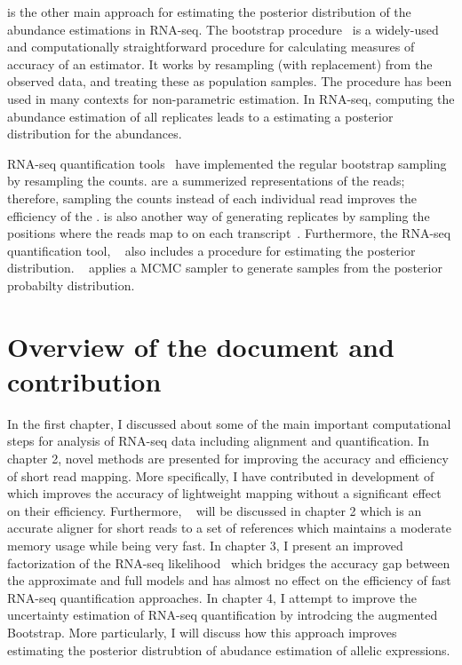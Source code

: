 \boots is the other main approach for estimating the posterior distribution of the abundance
estimations in RNA-seq. The bootstrap procedure~\citep{efron1979computers} is a widely-used 
and computationally straightforward procedure for calculating measures of accuracy of an 
estimator. It works by resampling (with replacement) from the observed data, and treating 
these as population samples. The procedure has been used in many contexts for non-parametric 
estimation. In RNA-seq, computing the abundance estimation of all \boot replicates leads to a 
estimating a posterior distribution for the abundances. 

RNA-seq quantification tools~\citep{kallisto,salmon} have implemented the regular bootstrap 
sampling by resampling the \eqc counts. \Eqcs are a summerized representations of the reads; 
therefore, sampling the \eqc counts instead of each individual read improves the efficiency 
of the \boots. \Pboots is also another way of generating \boot replicates by sampling the 
positions where the reads map to on each transcript~\citep{xiong2016probabilistic}.
Furthermore, the RNA-seq quantification tool, \salmon~\citep{salmon} also includes a \gibbs
procedure for estimating the posterior distribution. \bitseq~\citep{glaus2012identifying} 
applies a MCMC \gib sampler to generate samples from the posterior probabilty distribution. 

\section{Overview of the document and contribution}
In the first chapter, I discussed about some of the main important computational steps
for analysis of RNA-seq data including alignment and quantification.
In chapter 2, novel methods are presented for improving the accuracy and efficiency of 
short read mapping. More specifically, I have contributed in development 
of \sla~\citep{selaln} which improves
the accuracy of lightweight mapping without a significant effect on their efficiency.
Furthermore,  \puffaligner~\citep{almodaresi2021puffaligner} 
will be discussed in chapter 2 which is an accurate aligner for short reads
to a set of references which maintains a moderate memory usage while being very fast.
In chapter 3, I present an improved factorization of the RNA-seq likelihood~\citep{ddfact} 
which bridges the accuracy gap between the approximate and full models and has almost 
no effect on the efficiency of fast RNA-seq quantification approaches.
In chapter 4, I attempt to improve the uncertainty estimation of RNA-seq quantification by 
introdcing the augmented Bootstrap. More particularly, I will discuss how this approach 
improves estimating the posterior distrubtion of abudance estimation of allelic expressions.

